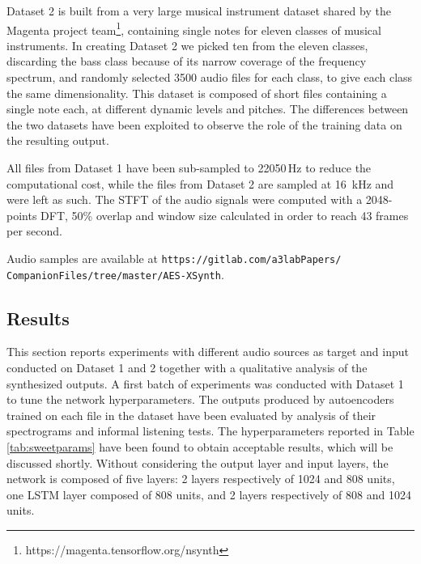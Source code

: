 Dataset 2 is built from a very large musical instrument dataset shared by the Magenta project team\footnote{https://magenta.tensorflow.org/nsynth}, containing single notes for eleven classes of musical instruments. In creating Dataset 2 we picked ten from the eleven classes, discarding the bass class because of its narrow coverage of the frequency spectrum, and randomly selected 3500 audio files for each class, to give each class the same dimensionality. This dataset is composed of short files containing a single note each, at different dynamic levels and pitches. The differences between the two datasets have been exploited to observe the role of the training data on the resulting output.

All files from Dataset 1 have been sub-sampled to 22050\,Hz to reduce the computational cost, while the files from Dataset 2 are sampled at 16~kHz and were left as such. The STFT of the audio signals were computed with a 2048-points DFT, 50\% overlap and window size calculated in order to reach 43 frames per second.

Audio samples are available at \texttt{https://gitlab.com/a3labPapers/\\CompanionFiles/tree/master/AES-XSynth}.

\subsection{Results}
\label{sec:results}
This section reports experiments with different audio sources as target and input conducted on Dataset 1 and 2 together with a qualitative analysis of the synthesized outputs.
A first batch of experiments was conducted with Dataset 1 to tune the network hyperparameters. The outputs produced by autoencoders trained on each file in the dataset have been evaluated by analysis of their spectrograms and informal listening tests. The hyperparameters reported in Table \ref{tab:sweetparams} have been found to obtain acceptable results, which will be discussed shortly. Without considering the output layer and input layers, the network is composed of five layers: 2 layers respectively of 1024 and 808 units, one LSTM layer composed of 808 units, and 2 layers respectively of 808 and 1024 units. 


